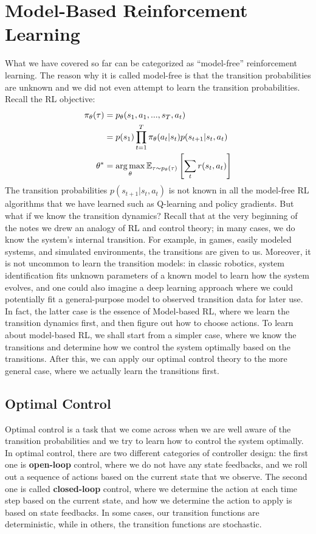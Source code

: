 \chapter{Model-Based Reinforcement Learning}
What we have covered so far can be categorized as ``model-free'' reinforcement learning. The reason why it is called model-free is that the transition probabilities are unknown and we did not even attempt to learn the transition probabilities. Recall the RL objective:
\begin{align*}
  \pi_\theta(\tau) &= p_\theta(s_1,a_1,...,s_T,a_t)\\
  &= p(s_1)\prod_{t=1}^T\pi_\theta(a_t|s_t)p(s_{t+1}|s_t,a_t)\\
  \theta^* &= \operatorname*{arg\,max}_\theta\mathbb{E}_{\tau\sim p_\theta(\tau)}\left[\sum_t r(s_t,a_t)\right]
\end{align*}
The transition probabilities $p(s_{t+1}|s_t,a_t)$ is not known in all the model-free RL algorithms that we have learned such as Q-learning and policy gradients. But what if we know the transition dynamics? Recall that at the very beginning of the notes we drew an analogy of RL and control theory; in many cases, we do know the system's internal transition. For example, in games, easily modeled systems, and simulated environments, the transitions are given to us. Moreover, it is not uncommon to learn the transition models: in classic robotics, system identification fits unknown parameters of a known model to learn how the system evolves, and one could also imagine a deep learning approach where we could potentially fit a general-purpose model to observed transition data for later use. In fact, the latter case is the essence of Model-based RL, where we learn the transition dynamics first, and then figure out how to choose actions. To learn about model-based RL, we shall start from a simpler case, where we know the transitions and determine how we control the system optimally based on the transitions. After this, we can apply our optimal control theory to the more general case, where we actually learn the transitions first.
\section{Optimal Control}
Optimal control is a task that we come across when we are well aware of the transition probabilities and we try to learn how to control the system optimally. In optimal control, there are two different categories of controller design: the first one is \textbf{open-loop} control, where we do not have any state feedbacks, and we roll out a sequence of actions based on the current state that we observe. The second one is called \textbf{closed-loop} control, where we determine the action at each time step based on the current state, and how we determine the action to apply is based on state feedbacks. In some cases, our transition functions are deterministic, while in others, the transition functions are stochastic.

